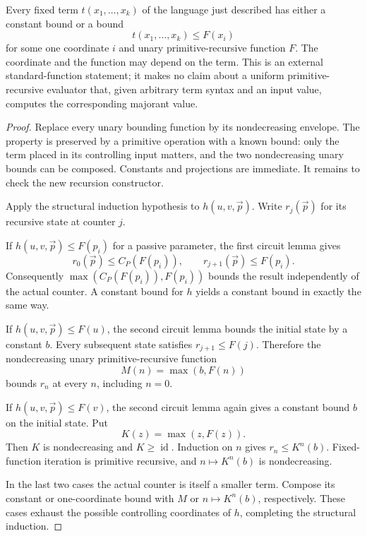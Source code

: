 \begin{theorem}
Every fixed term $t(x_1,\ldots,x_k)$ of the language just described has
either a constant bound or a bound
\[
              t(x_1,\ldots,x_k)\le F(x_i)
\]
for some one coordinate $i$ and unary primitive-recursive function $F$.
The coordinate and the function may depend on the term. This is an
external standard-function statement; it makes no claim about a uniform
primitive-recursive evaluator that, given arbitrary term syntax and an
input value, computes the corresponding majorant value.
\end{theorem}
\begin{proof}
Replace every unary bounding function by its nondecreasing envelope.
The property is preserved by a primitive operation with a known bound:
only the term placed in its controlling input matters, and the two
nondecreasing unary bounds can be composed. Constants and projections
are immediate. It remains to check the new recursion constructor.

Apply the structural induction hypothesis to
$h(u,v,\vec p)$. Write $r_j(\vec p)$ for its recursive state at counter
$j$.

If $h(u,v,\vec p)\le F(p_i)$ for a passive parameter, the first circuit
lemma gives
\[
 r_0(\vec p)\le C_P(F(p_i)),\qquad
 r_{j+1}(\vec p)\le F(p_i).
\]
Consequently $\max(C_P(F(p_i)),F(p_i))$ bounds the result independently
of the actual counter. A constant bound for $h$ yields a constant bound
in exactly the same way.

If $h(u,v,\vec p)\le F(u)$, the second circuit lemma bounds the initial
state by a constant $b$. Every subsequent state satisfies
$r_{j+1}\le F(j)$. Therefore the nondecreasing unary primitive-recursive
function
\[
                       M(n)=\max(b,F(n))
\]
bounds $r_n$ at every $n$, including $n=0$.

If $h(u,v,\vec p)\le F(v)$, the second circuit lemma again gives a
constant bound $b$ on the initial state. Put
\[
                       K(z)=\max(z,F(z)).
\]
Then $K$ is nondecreasing and $K\ge\operatorname{id}$. Induction on $n$
gives $r_n\le K^n(b)$. Fixed-function iteration is primitive recursive,
and $n\mapsto K^n(b)$ is nondecreasing.

In the last two cases the actual counter is itself a smaller term.
Compose its constant or one-coordinate bound with $M$ or
$n\mapsto K^n(b)$, respectively. These cases exhaust the possible
controlling coordinates of $h$, completing the structural induction.
\end{proof}

